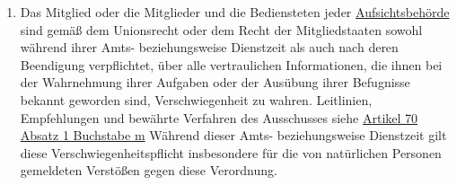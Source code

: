 \begin{enumerate}
\begin{enumerate}
  \end{enumerate}

  \item Das Mitglied oder die Mitglieder und die Bediensteten jeder \hyperref[itm:04-21]{Aufsichtsbehörde} sind gemäß
   dem Unionsrecht oder dem Recht der Mitgliedstaaten sowohl während ihrer Amts- beziehungsweise Dienstzeit als auch
   nach deren Beendigung verpflichtet, über alle vertraulichen Informationen, die ihnen bei der Wahrnehmung ihrer
   Aufgaben oder der Ausübung ihrer Befugnisse bekannt geworden sind, Verschwiegenheit zu wahren.\comment
   {Leitlinien, Empfehlungen und bewährte Verfahren des Ausschusses siehe \hyperref[itm:70-1m]{Artikel 70 Absatz 1
   Buchstabe m}} Während dieser Amts- beziehungsweise Dienstzeit gilt diese Verschwiegenheitspflicht insbesondere für
   die von natürlichen Personen gemeldeten Verstößen gegen diese Verordnung.%
  \label{itm:54-2}

\end{enumerate}


